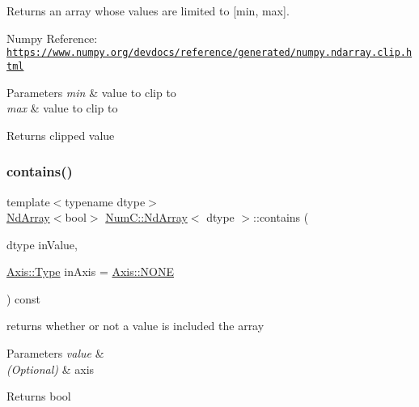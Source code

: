 Returns an array whose values are limited to \mbox{[}min, max\mbox{]}.

Numpy Reference\+: \href{https://www.numpy.org/devdocs/reference/generated/numpy.ndarray.clip.html}{\tt https\+://www.\+numpy.\+org/devdocs/reference/generated/numpy.\+ndarray.\+clip.\+html}


\begin{DoxyParams}{Parameters}
{\em min} & value to clip to \\
\hline
{\em max} & value to clip to \\
\hline
\end{DoxyParams}
\begin{DoxyReturn}{Returns}
clipped value 
\end{DoxyReturn}
\mbox{\label{class_num_c_1_1_nd_array_a539de1546f457bf67a4c61188d783504}} 
\subsubsection{\texorpdfstring{contains()}{contains()}}
{\footnotesize\ttfamily template$<$typename dtype$>$ \\
\mbox{\hyperlink{class_num_c_1_1_nd_array}{Nd\+Array}}$<$bool$>$ \mbox{\hyperlink{class_num_c_1_1_nd_array}{Num\+C\+::\+Nd\+Array}}$<$ dtype $>$\+::contains (\begin{DoxyParamCaption}\item[{dtype}]{in\+Value,  }\item[{\mbox{\hyperlink{struct_num_c_1_1_axis_a8e689044ef1941a03482e730c5e7ebb3}{Axis\+::\+Type}}}]{in\+Axis = {\ttfamily \mbox{\hyperlink{struct_num_c_1_1_axis_a8e689044ef1941a03482e730c5e7ebb3a0ae033c4226f7184bf0050b101e7ed94}{Axis\+::\+N\+O\+NE}}} }\end{DoxyParamCaption}) const\hspace{0.3cm}{\ttfamily [inline]}}

returns whether or not a value is included the array


\begin{DoxyParams}{Parameters}
{\em value} & \\
\hline
{\em (\+Optional)} & axis \\
\hline
\end{DoxyParams}
\begin{DoxyReturn}{Returns}
bool 
\end{DoxyReturn}
\mbox{\label{class_num_c_1_1_nd_array_a1cac8d729a4ea624fd4512fc51b331e9}} 
